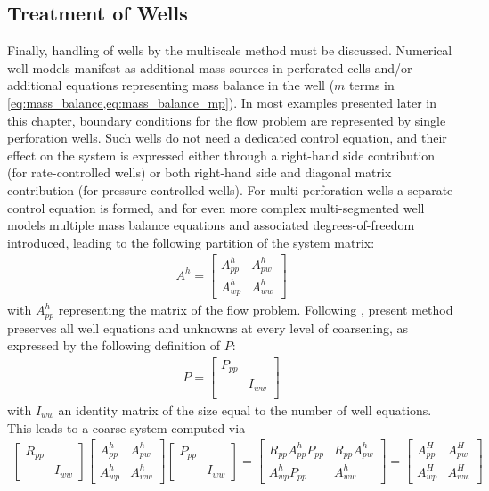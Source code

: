 \subsection{Treatment of Wells}
\label{subsec:coupled_wells}

Finally, handling of wells by the multiscale method must be discussed.   Numerical well models manifest as additional mass sources in perforated cells and/or additional equations representing mass balance in the well ($m$ terms in \cref{eq:mass_balance,eq:mass_balance_mp}).   In most examples presented later in this chapter, boundary conditions for the flow problem are represented by single perforation wells.   Such wells do not need a dedicated control equation, and their effect on the system is expressed either through a right-hand side contribution (for rate-controlled wells) or both right-hand side and diagonal matrix contribution (for pressure-controlled wells).   For multi-perforation wells a separate control equation is formed, and for even more complex multi-segmented well models multiple mass balance equations and associated degrees-of-freedom introduced, leading to the following partition of the system matrix:
\begin{align}
    A^h =
    \begin{bmatrix}
        A_{pp}^h & A_{pw}^h \\
        A_{wp}^h & A_{ww}^h
    \end{bmatrix}
\end{align}
with $A_{pp}^h$ representing the matrix of the flow problem.   Following \cite{Moyner2016}, present method preserves all well equations and unknowns at every level of coarsening, as expressed by the following definition of $P$:
\begin{align}
    P =
    \begin{bmatrix}
        P_{pp} &        \\
               & I_{ww} \\
    \end{bmatrix}
\end{align}
with $I_{ww}$ an identity matrix of the size equal to the number of well equations.   This leads to a coarse system computed via
\begin{align}
    \begin{bmatrix}
		R_{pp} &       \\
		       & I_{ww}
	\end{bmatrix}
	\begin{bmatrix}
		A_{pp}^h & A_{pw}^h \\
		A_{wp}^h & A_{ww}^h
	\end{bmatrix}
	\begin{bmatrix}
	    P_{pp} &       \\
		       & I_{ww}
	\end{bmatrix} =
	\begin{bmatrix}
	    R_{pp} A_{pp}^h P_{pp}   & R_{pp} A_{pw}^h \\
	    A_{wp}^h P_{pp} & A_{ww}^h
	\end{bmatrix} =
	\begin{bmatrix}
		A_{pp}^H & A_{pw}^H \\
		A_{wp}^H & A_{ww}^H
	\end{bmatrix}
\end{align}
